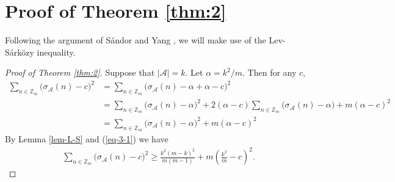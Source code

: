 \documentclass[12pt,a4paper,reqno]{amsart}
\numberwithin{equation}{section}
\theoremstyle{plain}
\theoremstyle{definition}
\begin{document}
\section{Proof of Theorem \ref{thm:2}}
Following the argument of S\'andor and Yang \cite[Theorem 1.2]{SY17}, we will make use of the Lev-S\'ark\"ozy inequality.

\begin{proof}[Proof of Theorem \ref{thm:2}]
    Suppose that $|\mathcal{A}|=k$. Let $\alpha=k^2/m$. Then for any $c$,
    \begin{align}\label{eq-3-1}
        \sum_{n\in \mathbb{Z}_m}\big(\sigma_{\mathcal{A}}(n)-c\big)^2&=\sum_{n\in \mathbb{Z}_m}\big(\sigma_{\mathcal{A}}(n)-\alpha+\alpha-c\big)^2\nonumber\\
        &=\sum_{n\in \mathbb{Z}_m}\big(\sigma_{\mathcal{A}}(n)-\alpha\big)^2+2(\alpha-c)\sum_{n\in\mathbb{Z}_m}\big(\sigma_{\mathcal{A}}(n)-\alpha\big)+m(\alpha-c)^2\nonumber\\
        &=\sum_{n\in \mathbb{Z}_m}\big(\sigma_{\mathcal{A}}(n)-\alpha\big)^2+m(\alpha-c)^2
    \end{align}
    By Lemma \ref{lem-L-S} and (\ref{eq-3-1}) we have
    \begin{align}\label{eq-3-2}
     \sum_{n\in \mathbb{Z}_m}\big(\sigma_{\mathcal{A}}(n)-c\big)^2 \ge \frac{k^2(m-k)^2}{m(m-1)}+m\left(\frac{k^2}{m}-c\right)^2.
    \end{align}
    

\end{proof}
\end{document}
